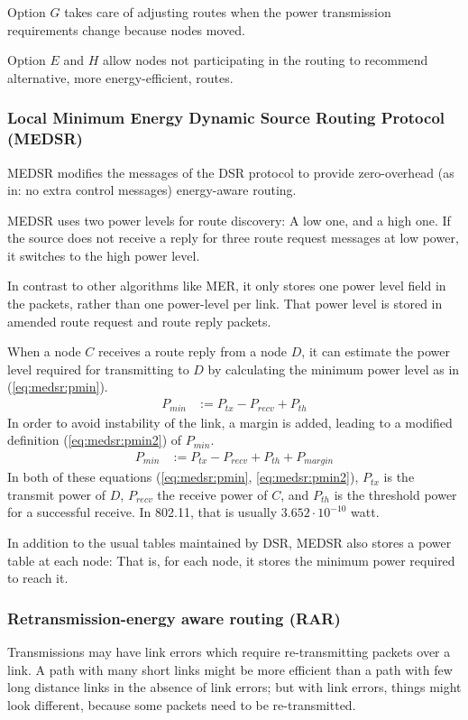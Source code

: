 Option $G$ takes care of adjusting routes when the power transmission requirements
change because nodes moved.

Option $E$ and $H$ allow nodes not participating in the routing to recommend
alternative, more energy-efficient, routes.
\subsubsection{Local Minimum Energy Dynamic Source Routing Protocol (MEDSR)}
MEDSR\cite{tanque2007minimum} modifies the messages of the DSR protocol to
provide zero-overhead (as in: no extra control messages) energy-aware routing.

MEDSR uses two power levels for route discovery: A low one, and a high one. If
the source does not receive a reply for three route request messages at low
power, it switches to the high power level.

In contrast to other algorithms like MER, it only stores one power level field
in the packets, rather than one power-level per link. That power level is stored
in amended route request and route reply packets.

When a node $C$ receives a route reply from a node $D$, it can estimate the
power level required for transmitting to $D$ by calculating the minimum power
level as in (\ref{eq:medsr:pmin}).
\begin{align}
  \label{eq:medsr:pmin}
   P_{min} &:= P_{tx} - P_{recv} + P_{th} 
\end{align}
In order to avoid instability of the link, a margin is added,
leading to a modified definition (\ref{eq:medsr:pmin2}) of $P_{min}$.
\begin{align}
  \label{eq:medsr:pmin2}
   P_{min} &:= P_{tx} - P_{recv} + P_{th} + P_{margin}
\end{align}
In both of these equations (\ref{eq:medsr:pmin}, \ref{eq:medsr:pmin2}), $P_{tx}$ is the transmit power of $D$, $P_{recv}$ the receive power of $C$,
and $P_{th}$ is the threshold power for a successful receive. In 802.11, that is
usually $3.652 \cdot 10^{-10}$ watt.

In addition to the usual tables maintained by DSR, MEDSR also stores a power
table at each node: That is, for each node, it stores the minimum power required to reach it.



\subsubsection{Retransmission-energy aware routing (RAR)}
Transmissions may have link errors which require re-transmitting packets over
a link. A path with many short links might be more efficient than a path with
few long distance links in the absence of link errors; but with link errors,
things might look different, because some packets need to be re-transmitted.

